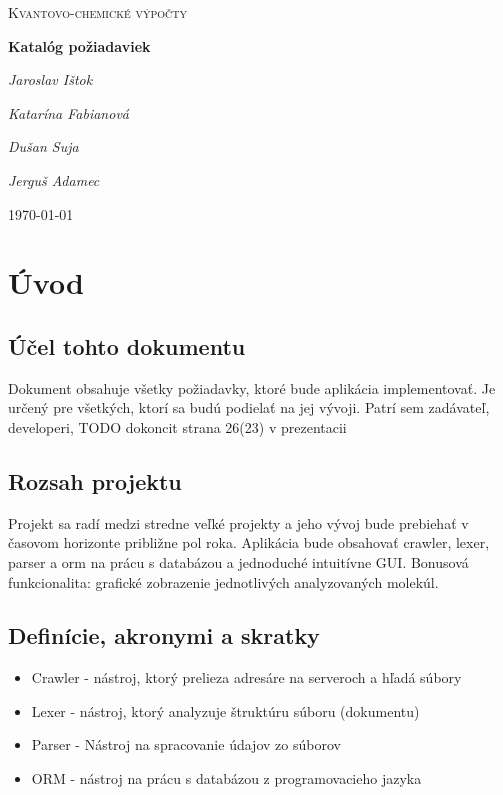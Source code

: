 \documentclass[12pt,a4paper]{article}
\begin{document}
\begin{titlepage}
	\centering
	\par\vspace{1cm}
	{\scshape\LARGE Kvantovo-chemické výpočty \par}
	\vspace{1cm}

	{\huge\bfseries Katalóg požiadaviek  \par}
	\vspace{2cm}
	{\Large\itshape Jaroslav Ištok \par}
	{\Large\itshape Katarína Fabianová \par}
	{\Large\itshape Dušan Suja \par}
	{\Large\itshape Jerguš Adamec \par}
	\vfill
	{\large \today\par}
\end{titlepage}

\pagebreak

\tableofcontents

\pagebreak

\section{Úvod}

\subsection{Účel tohto dokumentu}
Dokument obsahuje všetky požiadavky, ktoré bude aplikácia implementovať. Je určený pre všetkých, ktorí sa budú podielať na jej vývoji. Patrí sem zadávateľ, developeri, TODO dokoncit strana 26(23) v prezentacii

\subsection{Rozsah projektu}
Projekt sa radí medzi stredne veľké projekty a jeho vývoj bude prebiehať v časovom horizonte približne pol roka.
Aplikácia bude obsahovať crawler, lexer, parser a orm na prácu s databázou a jednoduché intuitívne GUI.
Bonusová funkcionalita: grafické zobrazenie jednotlivých analyzovaných molekúl.

\subsection{Definície, akronymi a skratky}
\begin{itemize}
	\item Crawler - nástroj, ktorý prelieza adresáre na serveroch a hľadá súbory
	\item Lexer - nástroj, ktorý analyzuje štruktúru súboru (dokumentu)
	\item Parser - Nástroj na spracovanie údajov zo súborov
	\item ORM - nástroj na prácu s databázou z programovacieho jazyka
\end{itemize}
\end{document}
